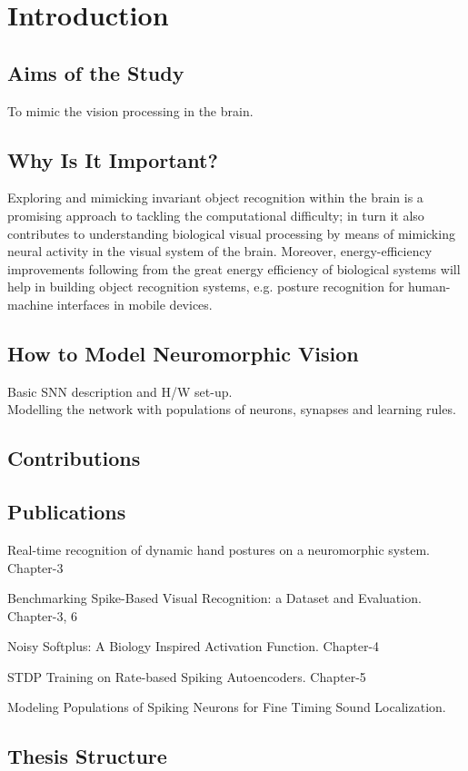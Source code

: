 \chapter{Introduction}
\label{cha:intro}

\section{Aims of the Study}
\label{sec:aim}
To mimic the vision processing in the brain.

\section{Why Is It Important?}
\label{sec:imp}
Exploring and mimicking invariant object recognition within the brain is a promising approach to tackling the computational difficulty;
in turn it also contributes to understanding biological visual processing by means of mimicking neural activity in the visual system of the brain.
Moreover, energy-efficiency improvements following from the great energy efficiency of biological systems will help in building object recognition systems, e.g. posture recognition for human-machine interfaces in mobile devices.  

\section{How to Model Neuromorphic Vision}
\label{sec:how}
Basic SNN description and H/W set-up.\\
Modelling the network with populations of neurons, synapses and learning rules.

\section{Contributions}
\label{sec:ctb}

\section{Publications}
Real-time recognition of dynamic hand postures on a neuromorphic system. Chapter-3

Benchmarking Spike-Based Visual Recognition: a Dataset and Evaluation. Chapter-3, 6

Noisy Softplus: A Biology Inspired Activation Function. Chapter-4

STDP Training on Rate-based Spiking Autoencoders. Chapter-5

Modeling  Populations  of  Spiking  Neurons  for  Fine  Timing  Sound Localization.
\section{Thesis Structure}
\label{sec:str}